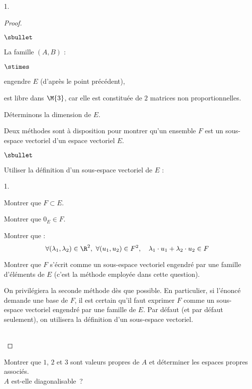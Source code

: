 \documentclass[11pt]{article}%
\begin{document}
\begin{noliste}{1.}
\begin{proof}
\begin{noliste}{$\sbullet$}
    \item La famille $(A,B)$ :
    \begin{noliste}{$\stimes$}
      \item engendre $E$ (d'après le point précédent),
      \item est libre dans $\M{3}$, car elle est constituée de $2$ 
      matrices non proportionnelles.
    \end{noliste}
    
    \item Déterminons la dimension de $E$.
  \end{noliste}
  
  \newpage
  
  \begin{remark}
   Deux méthodes sont à disposition pour montrer qu'un ensemble $F$ est 
   un sous-espace vectoriel d'un espace vectoriel $E$.
   \begin{noliste}{$\sbullet$}
    \item Utiliser la définition d'un sous-espace vectoriel de $E$ :
    \begin{noliste}{\scriptsize 1.}
      \item Montrer que $F \subset E$.
      \item Montrer que $0_E \in F$.
      \item Montrer que : 
      \[
      \forall (\lambda_1, \lambda_2) \in \R^2, \ 
      \forall (u_1,u_2)\in F^2, \quad 
      \lambda_1 \cdot u_1 + \lambda_2 \cdot u_2 \in F
      \]
    \end{noliste}
    \item Montrer que $F$ s'écrit comme un sous-espace vectoriel 
    engendré par une famille d'éléments de $E$ (c'est la méthode 
    employée dans cette question).
   \end{noliste}
   On privilégiera la seconde méthode dès que possible. En
   particulier, si l'énoncé demande une base de $F$, il est certain
   qu'il faut exprimer $F$ comme un sous-espace vectoriel engendré par
   une famille de $E$. Par défaut (et par défaut seulement), on
   utilisera la définition d'un sous-espace vectoriel.
  \end{remark}~\\[-1.4cm]
 \end{proof}


 \item Montrer que $1$, $2$ et $3$ sont valeurs propres de $A$ et 
 déterminer les espaces propres associés.\\ 
 $A$ est-elle diagonalisable~?
 

\end{noliste}
\end{document}
